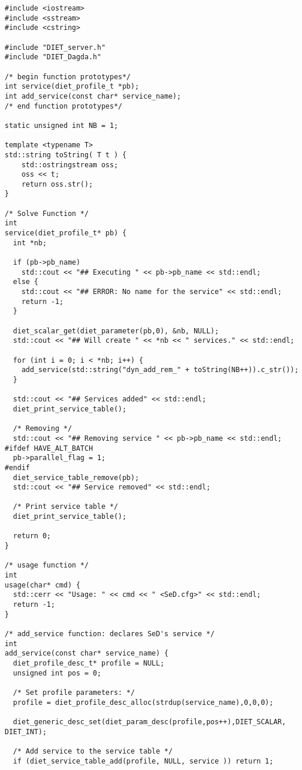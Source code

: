 {\footnotesize
\begin{verbatim}
#include <iostream>
#include <sstream>
#include <cstring>

#include "DIET_server.h"
#include "DIET_Dagda.h"

/* begin function prototypes*/
int service(diet_profile_t *pb);
int add_service(const char* service_name);
/* end function prototypes*/

static unsigned int NB = 1;

template <typename T>
std::string toString( T t ) {
    std::ostringstream oss;
    oss << t;
    return oss.str();
}

/* Solve Function */
int
service(diet_profile_t* pb) {
  int *nb;

  if (pb->pb_name)
    std::cout << "## Executing " << pb->pb_name << std::endl;
  else {
    std::cout << "## ERROR: No name for the service" << std::endl;
    return -1;
  }

  diet_scalar_get(diet_parameter(pb,0), &nb, NULL);
  std::cout << "## Will create " << *nb << " services." << std::endl;

  for (int i = 0; i < *nb; i++) {
    add_service(std::string("dyn_add_rem_" + toString(NB++)).c_str());
  }

  std::cout << "## Services added" << std::endl;
  diet_print_service_table();

  /* Removing */
  std::cout << "## Removing service " << pb->pb_name << std::endl;
#ifdef HAVE_ALT_BATCH
  pb->parallel_flag = 1;
#endif
  diet_service_table_remove(pb);
  std::cout << "## Service removed" << std::endl;

  /* Print service table */
  diet_print_service_table();

  return 0;
}

/* usage function */
int
usage(char* cmd) {
  std::cerr << "Usage: " << cmd << " <SeD.cfg>" << std::endl;
  return -1;
}

/* add_service function: declares SeD's service */
int
add_service(const char* service_name) {
  diet_profile_desc_t* profile = NULL;
  unsigned int pos = 0;

  /* Set profile parameters: */
  profile = diet_profile_desc_alloc(strdup(service_name),0,0,0);

  diet_generic_desc_set(diet_param_desc(profile,pos++),DIET_SCALAR, DIET_INT);

  /* Add service to the service table */
  if (diet_service_table_add(profile, NULL, service )) return 1;


\end{verbatim}}
